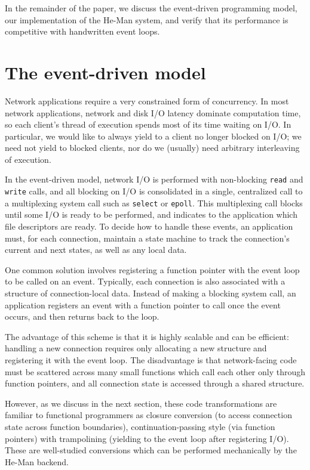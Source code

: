 \documentclass[preprint]{sigplanconf}
\renewcommand{\t}{\texttt}
\begin{document}
In the remainder of the paper, we discuss the event-driven programming model,
our implementation of the He-Man system, and verify that its performance is
competitive with handwritten event loops.

\section{The event-driven model}

Network applications require a very constrained form of
concurrency. In most network applications, network and disk
I/O latency dominate computation time, so each client's thread
of execution spends most of its time waiting on I/O. In particular, we
would like to always yield to a client no longer blocked on I/O; we
need not yield to blocked clients, nor do we (usually) need arbitrary
interleaving of execution.

In the event-driven model, network I/O is performed with non-blocking
\t{read} and \t{write} calls, and all blocking on I/O is consolidated
in a single, centralized call to a multiplexing system call such as
\t{select} or \t{epoll}. This multiplexing call blocks until some 
I/O is ready to be performed, and indicates to the application
which file descriptors are ready. To decide how to handle these 
events, an application must, for each connection, maintain a
state machine to track the connection's current and next states, as 
well as any local data.

One common solution involves registering a function
pointer with the event loop to be called on an event. Typically, each
connection is also associated with a structure of connection-local
data. Instead of making a blocking system call, an application
registers an event with a function pointer to call once the event 
occurs, and then returns back to the loop.

The advantage of this scheme is that it is highly scalable and can be
efficient: handling a new connection requires only allocating a new 
structure and registering it with the event loop. The disadvantage is 
that network-facing code must be scattered across many small functions 
which call each other only through function pointers, and all connection 
state is accessed through a shared structure.

However, as we discuss in the next section, these code transformations are
familiar to functional programmers as closure conversion (to access connection
state across function boundaries), continuation-passing style (via function
pointers) with trampolining (yielding to the event loop after registering I/O).
These are well-studied conversions which can be performed mechanically by the
He-Man backend.
\end{document}
